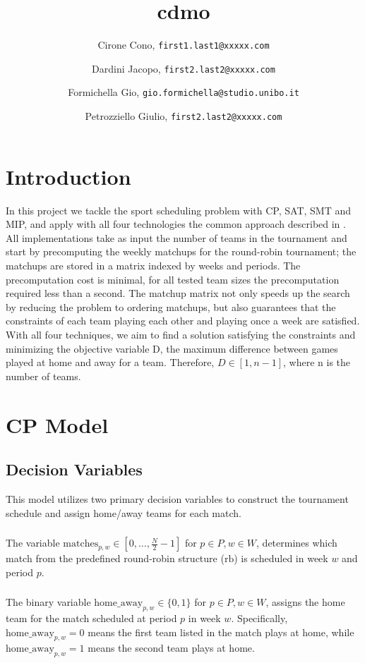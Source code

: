 \documentclass{article}
\title{cdmo}
\author{
  Cirone Cono, \texttt{first1.last1@xxxxx.com}
  \and
  Dardini Jacopo, \texttt{first2.last2@xxxxx.com}
  \and
  Formichella Gio, \texttt{gio.formichella@studio.unibo.it}
  \and
  Petrozziello Giulio, \texttt{first2.last2@xxxxx.com}
}
\date{}
\begin{document}
\maketitle

\section{Introduction}
In this project we tackle the sport scheduling problem with CP, SAT, SMT and MIP, and apply with all four technologies the common approach described in \cite{10.1007/10704567_6}. All implementations take as input the number of teams in the tournament and start by precomputing the weekly matchups for the round-robin tournament; the matchups are stored in a matrix indexed by weeks and periods. The precomputation cost is minimal, for all tested team sizes the precomputation required less than a second. The matchup matrix not only speeds up the search by reducing the problem to ordering matchups, but also guarantees that the constraints of each team playing each other and playing once a week are satisfied. With all four techniques, we aim to find a solution satisfying the constraints and minimizing the objective variable D, the maximum difference between games played at home and away for a team. Therefore, $D\in [1, n-1]$, where n is the number of teams. 

\section{CP Model}
\subsection{Decision Variables}
This model utilizes two primary decision variables to construct the tournament schedule and assign home/away teams for each match.

\subsubsection{}
The variable $\text{matches}_{p, w} \in [0, \dots, \frac{N}{2} - 1]$ for $p \in P, w \in W$, determines which match from the predefined round-robin structure ($\text{rb}$) is scheduled in week $w$ and period $p$.

\subsubsection{}
The binary variable $\text{home\_away}_{p, w} \in \{0, 1\}$ for $p \in P, w \in W$, assigns the home team for the match scheduled at period $p$ in week $w$. Specifically, $\text{home\_away}_{p, w} = 0$ means the first team listed in the match plays at home, while $\text{home\_away}_{p, w} = 1$ means the second team plays at home.
\end{document}
